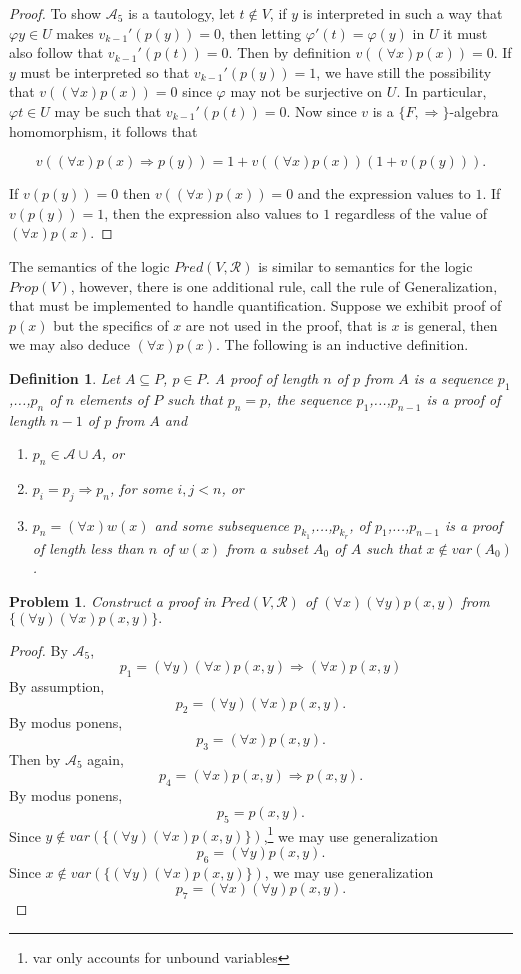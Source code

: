 \documentclass{article}
\theoremstyle{problemstyle}
\newtheorem{problem}{Problem}
\theoremstyle{lemmastyle}
\theoremstyle{theoremstyle}
\theoremstyle{problemstyle}
\newtheorem{definition}{Definition}
\begin{document}
\begin{proof}
To show $\mathscr{A}_5$ is a tautology, let $t \notin V$, if $y$ is interpreted in such a way that $\varphi y \in U$ makes $v_{k-1}'(p(y)) = 0$, then letting $\varphi'(t) = \varphi(y)$ in $U$ it must also follow that $v_{k-1}'(p(t)) = 0$. Then by definition $v((\forall x)p(x)) = 0$. If $y$ must be interpreted so that $v_{k-1}'(p(y)) = 1$, we have still the possibility that $v((\forall x)p(x)) = 0$ since $\varphi$ may not be surjective on $U$. In particular, $\varphi t \in U$ may be such that $v_{k-1}'(p(t)) = 0$. Now since $v$ is a $\{F, \Rightarrow\}$-algebra homomorphism, it follows that 

$$v((\forall x)p(x)\Rightarrow p(y)) = 1+v((\forall x)p(x))(1+v(p(y))).$$

If $v(p(y)) = 0$ then $v((\forall x)p(x)) = 0$ and the expression values to $1$. If  $v(p(y)) = 1$, then the expression also values to $1$ regardless of the value of $(\forall x)p(x)$. 
\end{proof}

The semantics of the logic $Pred(V, \mathscr{R})$ is similar to semantics for the logic $Prop(V)$, however, there is one additional rule, call the rule of Generalization, that must be implemented to handle quantification. Suppose we exhibit proof of $p(x)$ but the specifics of $x$ are not used in the proof, that is $x$ is general, then we may also deduce $(\forall x)p(x)$. The following is an inductive definition. 

\begin{definition}
Let $A \subseteq P$, $p \in P$. A \textit{proof of length $n$} of $p$ from $A$ is a sequence $p_1$,...,$p_n$ of $n$ elements of $P$ such that $p_n = p$, the sequence $p_1$,...,$p_{n-1}$ is a proof of length $n-1$ of $p$ from $A$ and 
\begin{enumerate}
\item $p_n \in \mathscr{A} \cup A$, or
\item $p_i = p_j \Rightarrow p_n$, for some $i,j < n$, or
\item $p_n = (\forall x)w(x)$ and some subsequence $p_{k_1}$,...,$p_{k_r}$, of $p_1$,...,$p_{n-1}$ is a proof of length less than $n$ of $w(x)$ from a subset $A_0$ of $A$ such that $x \notin var(A_0)$.
\end{enumerate}
\end{definition}

\begin{problem}
Construct a proof in $Pred(V,\mathscr{R})$ of $(\forall x)(\forall y)p(x,y)$ from $\{(\forall y)(\forall x)p(x,y)\}.$
\end{problem}

\begin{proof}
By $\mathscr{A}_5$,
$$p_1 = (\forall y)(\forall x)p(x,y) \Rightarrow (\forall x)p(x,y)$$
By assumption,
$$p_2 = (\forall y)(\forall x)p(x,y).$$
By modus ponens, 
$$p_3 =(\forall x)p(x,y).$$
Then by $\mathscr{A}_5$ again, 
$$p_4 = (\forall x)p(x,y) \Rightarrow p(x,y).$$
By modus ponens, 
$$p_5 = p(x,y).$$
Since $y \notin var(\{(\forall y)(\forall x)p(x,y)\})$,\footnote{var only accounts for unbound variables} we may use generalization
$$p_6 = (\forall y)p(x,y).$$
Since $x \notin var(\{(\forall y)(\forall x)p(x,y)\})$, we may use generalization
$$p_7 = (\forall x)(\forall y)p(x,y).$$
\end{proof}
\end{document}
